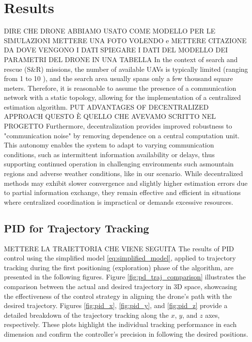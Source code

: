 \section{Results}
DIRE CHE DRONE ABBIAMO USATO COME MODELLO PER LE SIMULAZIONI
METTERE UNA FOTO VOLENDO e METTERE CITAZIONE DA DOVE VENGONO I DATI
SPIEGARE I DATI DEL MODELLO DEI PARAMETRI DEL DRONE IN UNA TABELLA
In the context of search and rescue (S\&R) missions, the number of available 
UAVs is typically limited (ranging from 1 to 10 \cite{PSO_original}), and the search area 
usually spans only a few thousand square meters.
Therefore, it is reasonable to 
assume the presence of a communication network with a static topology, allowing 
for the implementation of a centralized estimation algorithm.
PUT ADVANTAGES OF DECENTRALIZED APPROACH
QUESTO È QUELLO CHE AVEVAMO SCRITTO NEL PROGETTO
Furthermore, decentralization provides improved robustness to "communication noise" by removing 
dependence on a central computation unit. This autonomy enables the system to adapt to varying 
communication conditions, such as intermittent information availability or delays, thus supporting 
continued operation in challenging environments such asmountain regions and adverse weather 
conditions, like in our scenario. While decentralized methods may exhibit slower convergence and slightly higher estimation 
errors due to partial information exchange, they remain effective and efficient in situations where 
centralized coordination is impractical or demands excessive resources.

\subsection{PID for Trajectory Tracking}
METTERE LA TRAIETTORIA CHE VIENE SEGUITA
The results of PID control using the simplified model \eqref{eq:simplified_model}, applied to trajectory tracking during the first positioning (exploration) phase of the algorithm, are presented in the following figures. Figure \ref{fig:pd_traj_comparison} illustrates the comparison between the actual and desired trajectory in 3D space, showcasing the effectiveness of the control strategy in aligning the drone's path with the desired trajectory. Figures \ref{fig:pid_x}, \ref{fig:pid_y}, and \ref{fig:pid_z} provide a detailed breakdown of the trajectory tracking along the \(x\), \(y\), and \(z\) axes, respectively. These plots highlight the individual tracking performance in each dimension and confirm the controller's precision in following the desired positions.

